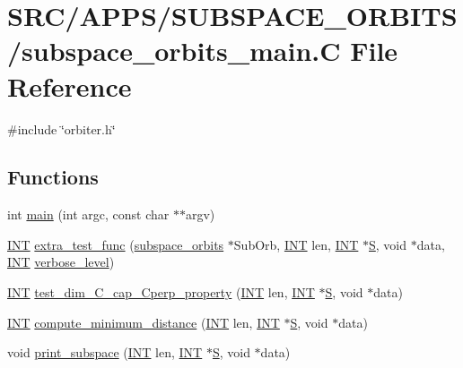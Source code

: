 \hypertarget{subspace__orbits__main_8_c}{}\section{S\+R\+C/\+A\+P\+P\+S/\+S\+U\+B\+S\+P\+A\+C\+E\+\_\+\+O\+R\+B\+I\+T\+S/subspace\+\_\+orbits\+\_\+main.C File Reference}
\label{subspace__orbits__main_8_c}
{\ttfamily \#include \char`\"{}orbiter.\+h\char`\"{}}\newline
\subsection*{Functions}
\begin{DoxyCompactItemize}
\item 
int \mbox{\hyperlink{subspace__orbits__main_8_c_a217dbf8b442f20279ea00b898af96f52}{main}} (int argc, const char $\ast$$\ast$argv)
\item 
\mbox{\hyperlink{galois_8h_a09fddde158a3a20bd2dcadb609de11dc}{I\+NT}} \mbox{\hyperlink{subspace__orbits__main_8_c_ad2f7f94724afe202bba758e5e93330e4}{extra\+\_\+test\+\_\+func}} (\mbox{\hyperlink{classsubspace__orbits}{subspace\+\_\+orbits}} $\ast$Sub\+Orb, \mbox{\hyperlink{galois_8h_a09fddde158a3a20bd2dcadb609de11dc}{I\+NT}} len, \mbox{\hyperlink{galois_8h_a09fddde158a3a20bd2dcadb609de11dc}{I\+NT}} $\ast$\mbox{\hyperlink{simeon_8_c_adab47f8243f1b5a2c31df2535d6b37d0}{S}}, void $\ast$data, \mbox{\hyperlink{galois_8h_a09fddde158a3a20bd2dcadb609de11dc}{I\+NT}} \mbox{\hyperlink{simeon_8_c_a818073fbcc2f439e7c56952f67386122}{verbose\+\_\+level}})
\item 
\mbox{\hyperlink{galois_8h_a09fddde158a3a20bd2dcadb609de11dc}{I\+NT}} \mbox{\hyperlink{subspace__orbits__main_8_c_abc1f3820a6262d17d9a173dff4e9e761}{test\+\_\+dim\+\_\+\+C\+\_\+cap\+\_\+\+Cperp\+\_\+property}} (\mbox{\hyperlink{galois_8h_a09fddde158a3a20bd2dcadb609de11dc}{I\+NT}} len, \mbox{\hyperlink{galois_8h_a09fddde158a3a20bd2dcadb609de11dc}{I\+NT}} $\ast$\mbox{\hyperlink{simeon_8_c_adab47f8243f1b5a2c31df2535d6b37d0}{S}}, void $\ast$data)
\item 
\mbox{\hyperlink{galois_8h_a09fddde158a3a20bd2dcadb609de11dc}{I\+NT}} \mbox{\hyperlink{subspace__orbits__main_8_c_a4df477fbec3d64334f000e211f31ff6b}{compute\+\_\+minimum\+\_\+distance}} (\mbox{\hyperlink{galois_8h_a09fddde158a3a20bd2dcadb609de11dc}{I\+NT}} len, \mbox{\hyperlink{galois_8h_a09fddde158a3a20bd2dcadb609de11dc}{I\+NT}} $\ast$\mbox{\hyperlink{simeon_8_c_adab47f8243f1b5a2c31df2535d6b37d0}{S}}, void $\ast$data)
\item 
void \mbox{\hyperlink{subspace__orbits__main_8_c_ae58f518aaf4590347ebdd0af5d3a3ffa}{print\+\_\+subspace}} (\mbox{\hyperlink{galois_8h_a09fddde158a3a20bd2dcadb609de11dc}{I\+NT}} len, \mbox{\hyperlink{galois_8h_a09fddde158a3a20bd2dcadb609de11dc}{I\+NT}} $\ast$\mbox{\hyperlink{simeon_8_c_adab47f8243f1b5a2c31df2535d6b37d0}{S}}, void $\ast$data)
\end{DoxyCompactItemize}

